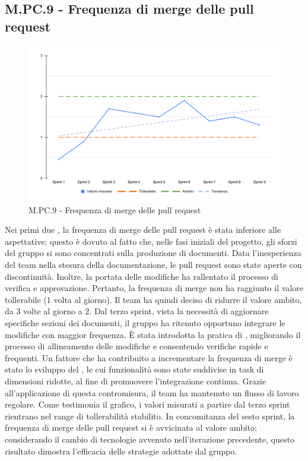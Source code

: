 \subsection{M.PC.9 - Frequenza di merge delle pull request}
\begin{figure}[H]
    \centering
    \includegraphics[width=\textwidth]{assets/frequenza_pull_request.pdf}
    \caption{M.PC.9 - Frequenza di merge delle pull request}
\end{figure}

\par Nei primi due , la frequenza di merge delle pull request è stata inferiore alle aspettative; questo è dovuto al fatto che, nelle fasi iniziali del progetto, gli sforzi del gruppo si sono concentrati sulla produzione di documenti. Data l’inesperienza del team nella stesura della documentazione, le pull request sono state aperte con discontinuità. Inoltre, la portata delle modifiche ha rallentato il processo di verifica e approvazione. Pertanto, la frequenza di merge non ha raggiunto il valore tollerabile (1 volta al giorno). Il team ha quindi deciso di ridurre il valore ambito, da 3 volte al giorno a 2. Dal terzo sprint, vista la necessità di aggiornare specifiche sezioni dei documenti, il gruppo ha ritenuto opportuno integrare le modifiche con maggior frequenza. È stata introdotta la pratica di , migliorando il processo di allineamento delle modifiche e consentendo verifiche rapide e frequenti. Un fattore che ha contribuito a incrementare la frequenza di merge è stato lo sviluppo del , le cui funzionalità sono state suddivise in task di dimensioni ridotte, al fine di promuovere l'integrazione continua. Grazie all’applicazione di questa contromisura, il team ha mantenuto un flusso di lavoro regolare. Come testimonia il grafico, i valori misurati a partire dal terzo sprint rientrano nel range di tollerabilità stabilito. In concomitanza del sesto sprint, la frequenza di merge delle pull request si è avvicinata al valore ambito; considerando il cambio di tecnologie avvenuto nell’iterazione precedente, questo risultato dimostra l’efficacia delle strategie adottate dal gruppo.
